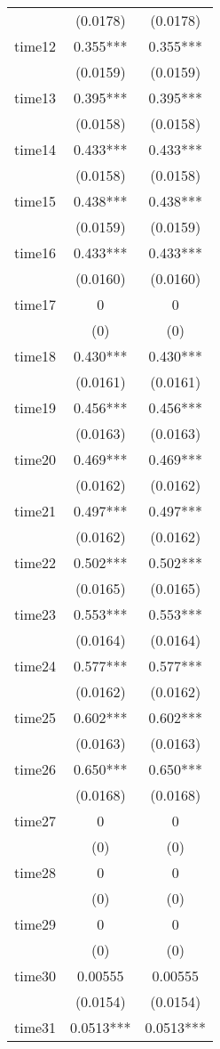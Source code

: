 \documentclass[]{article}
\begin{document}
\begin{tabular}{lcc}
 & (0.0178) & (0.0178) \\
time12 & 0.355*** & 0.355*** \\
 & (0.0159) & (0.0159) \\
time13 & 0.395*** & 0.395*** \\
 & (0.0158) & (0.0158) \\
time14 & 0.433*** & 0.433*** \\
 & (0.0158) & (0.0158) \\
time15 & 0.438*** & 0.438*** \\
 & (0.0159) & (0.0159) \\
time16 & 0.433*** & 0.433*** \\
 & (0.0160) & (0.0160) \\
time17 & 0 & 0 \\
 & (0) & (0) \\
time18 & 0.430*** & 0.430*** \\
 & (0.0161) & (0.0161) \\
time19 & 0.456*** & 0.456*** \\
 & (0.0163) & (0.0163) \\
time20 & 0.469*** & 0.469*** \\
 & (0.0162) & (0.0162) \\
time21 & 0.497*** & 0.497*** \\
 & (0.0162) & (0.0162) \\
time22 & 0.502*** & 0.502*** \\
 & (0.0165) & (0.0165) \\
time23 & 0.553*** & 0.553*** \\
 & (0.0164) & (0.0164) \\
time24 & 0.577*** & 0.577*** \\
 & (0.0162) & (0.0162) \\
time25 & 0.602*** & 0.602*** \\
 & (0.0163) & (0.0163) \\
time26 & 0.650*** & 0.650*** \\
 & (0.0168) & (0.0168) \\
time27 & 0 & 0 \\
 & (0) & (0) \\
time28 & 0 & 0 \\
 & (0) & (0) \\
time29 & 0 & 0 \\
 & (0) & (0) \\
time30 & 0.00555 & 0.00555 \\
 & (0.0154) & (0.0154) \\
time31 & 0.0513*** & 0.0513*** \\

\end{tabular}
\end{document}
